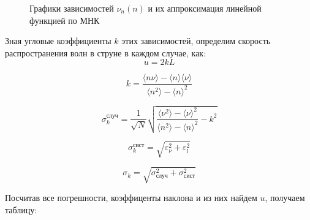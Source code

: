 \documentclass[
a4paper, %
12pt, %
]{article}
\begin{document}
	\begin{figure}[h!]
		\caption{Графики зависимостей $\nu_n(n)$ и их аппроксимация линейной функцией по МНК}
		\label{mnk_graph}
	\end{figure}
	
	\newpage
	
	Зная угловые коэффициенты $k$ этих зависимостей, определим скорость распространения волн в струне в каждом случае, как:
	\[u = 2kL \]
	
	\begin{equation}
		k=\frac{\langle n\nu\rangle-\langle n\rangle \langle \nu\rangle}{\langle n^2\rangle - \langle n\rangle^2}
	\end{equation}
	
	\begin{equation}
		\sigma_k^\text{случ}=\frac{1}{\sqrt{N}}\sqrt{\frac{\langle \nu^2 \rangle - \langle \nu \rangle^2}{\langle n^2 \rangle - \langle n \rangle^2} - k^2  }
	\end{equation}
	
	\begin{equation}
		\sigma_k^{\text{сист}} = \sqrt{ \varepsilon_\nu^2 + \varepsilon_l^2 }
	\end{equation}
	
	\begin{equation}
		\sigma_k = \sqrt{\sigma_\text{случ}^2 + \sigma_\text{сист}^2}
	\end{equation}
	
	Посчитав все погрешности, коэффиценты наклона и из них найдем $u$, получаем таблицу:
	
\end{document}

